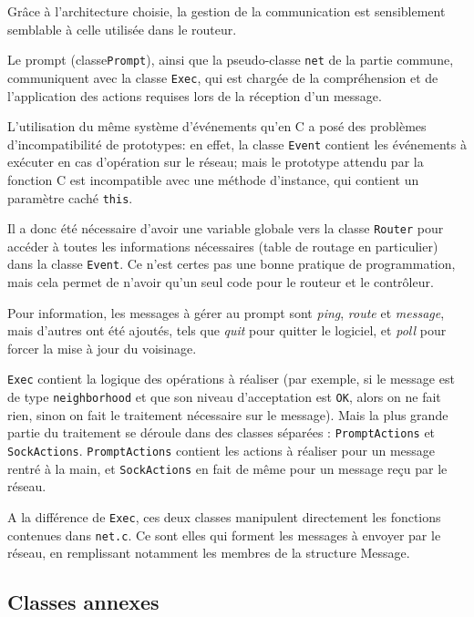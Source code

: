 \documentclass[a4paper,11pt]{article}
\begin{document}
Grâce à l'architecture choisie, la gestion de la communication est sensiblement semblable à celle utilisée dans le routeur.

Le prompt (classe\texttt{Prompt}), ainsi que la pseudo-classe \texttt{net} de la partie commune, communiquent avec la classe \texttt{Exec},
 qui est chargée de la compréhension et de l'application des actions requises lors de la réception d'un message.

L'utilisation du même système d'événements qu'en C a posé des problèmes d'incompatibilité de prototypes: en effet,
la classe \texttt{Event} contient les événements à exécuter en cas d'opération sur le réseau; mais le prototype attendu par la fonction C
est incompatible avec une méthode d'instance, qui contient un paramètre caché \texttt{this}.

Il a donc été nécessaire d'avoir une variable globale vers la classe \texttt{Router} pour accéder à toutes les informations nécessaires (table de routage en particulier) dans la classe \texttt{Event}. Ce n'est certes pas une bonne pratique de programmation, mais cela permet de n'avoir qu'un seul code pour le routeur et le contrôleur.

Pour information, les messages à gérer au prompt sont \textit{ping}, \textit{route} et \textit{message}, mais d'autres ont été ajoutés, tels que \textit{quit} pour quitter le logiciel, et \textit{poll} pour forcer la mise à jour du voisinage.

\texttt{Exec} contient la logique des opérations à réaliser (par exemple, si le message est de type \texttt{neighborhood} et que son niveau d'acceptation est \texttt{OK}, alors on ne fait rien, sinon on fait le traitement nécessaire sur le message). Mais la plus grande partie du traitement se déroule dans des classes séparées : \texttt{PromptActions} et \texttt{SockActions}. \texttt{PromptActions} contient les actions à réaliser pour un message rentré à la main, et \texttt{SockActions} en fait de même pour un message reçu par le réseau.

A la différence de \texttt{Exec}, ces deux classes manipulent directement les fonctions contenues dans \texttt{net.c}.
Ce sont elles qui forment les messages à envoyer par le réseau, en remplissant notamment les membres de la structure Message.

\subsection{Classes annexes}
\end{document}
